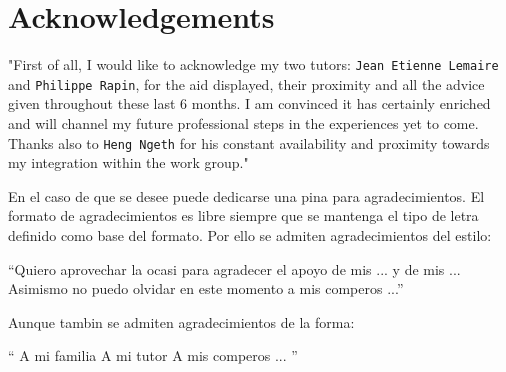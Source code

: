 

\chapter{Acknowledgements} \label{Acknowledgements}

\begin{parrafoDestacado}
"First of all, I would like to acknowledge my two tutors: \texttt{Jean Etienne Lemaire} and \texttt{Philippe Rapin}, for the aid displayed, their proximity and all the advice given throughout these last 6 months. I am convinced it has certainly enriched and will channel my future professional steps in the experiences yet to come.
Thanks also to \texttt{Heng Ngeth} for his constant availability and proximity towards my integration within the work group."
\end{parrafoDestacado}

En el caso de que se desee puede dedicarse una pina para agradecimientos. El formato de agradecimientos es libre siempre que se mantenga el tipo de letra definido como base del formato. Por ello se admiten agradecimientos del estilo: 

\begin{parrafoDestacado}
``Quiero aprovechar la ocasi para agradecer el apoyo de mis ... y de mis ...  Asimismo no puedo olvidar en este momento a mis comperos ...''
\end{parrafoDestacado}

Aunque tambin se admiten agradecimientos de la forma: 

\begin{flushright}
`` A mi familia\linebreak 
   A mi tutor  \linebreak
   A mis comperos \linebreak
... ''
\end{flushright}